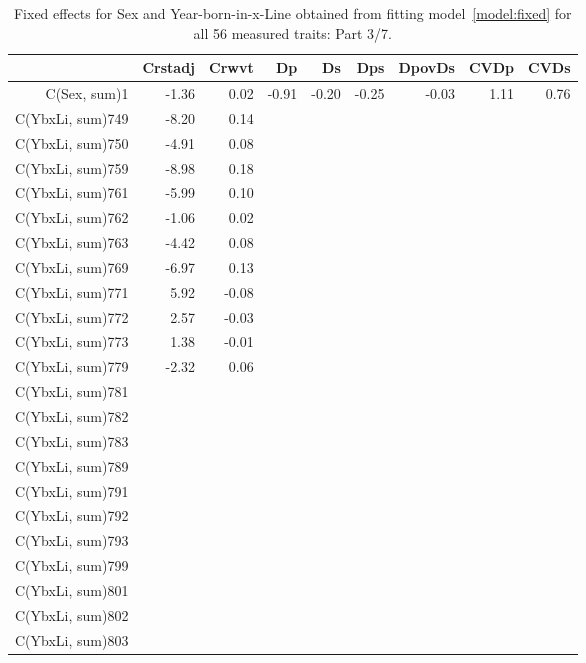 \begin{table}[p]
\centering
\caption{Fixed effects for Sex and Year-born-in-x-Line obtained from fitting model~\ref{model:fixed} for all 56 measured traits: Part 3/7.}
\label{tab:b3}
\begin{tabular}{rrrrrrrrr}
  \hline
 & Crstadj & Crwvt & Dp & Ds & Dps & DpovDs & CVDp & CVDs \\ 
  \hline
C(Sex, sum)1 & -1.36 & 0.02 & -0.91 & -0.20 & -0.25 & -0.03 & 1.11 & 0.76 \\ 
  C(YbxLi, sum)749 & -8.20 & 0.14 &  &  &  &  &  &  \\ 
  C(YbxLi, sum)750 & -4.91 & 0.08 &  &  &  &  &  &  \\ 
  C(YbxLi, sum)759 & -8.98 & 0.18 &  &  &  &  &  &  \\ 
  C(YbxLi, sum)761 & -5.99 & 0.10 &  &  &  &  &  &  \\ 
  C(YbxLi, sum)762 & -1.06 & 0.02 &  &  &  &  &  &  \\ 
  C(YbxLi, sum)763 & -4.42 & 0.08 &  &  &  &  &  &  \\ 
  C(YbxLi, sum)769 & -6.97 & 0.13 &  &  &  &  &  &  \\ 
  C(YbxLi, sum)771 & 5.92 & -0.08 &  &  &  &  &  &  \\ 
  C(YbxLi, sum)772 & 2.57 & -0.03 &  &  &  &  &  &  \\ 
  C(YbxLi, sum)773 & 1.38 & -0.01 &  &  &  &  &  &  \\ 
  C(YbxLi, sum)779 & -2.32 & 0.06 &  &  &  &  &  &  \\ 
  C(YbxLi, sum)781 &  &  &  &  &  &  &  &  \\ 
  C(YbxLi, sum)782 &  &  &  &  &  &  &  &  \\ 
  C(YbxLi, sum)783 &  &  &  &  &  &  &  &  \\ 
  C(YbxLi, sum)789 &  &  &  &  &  &  &  &  \\ 
  C(YbxLi, sum)791 &  &  &  &  &  &  &  &  \\ 
  C(YbxLi, sum)792 &  &  &  &  &  &  &  &  \\ 
  C(YbxLi, sum)793 &  &  &  &  &  &  &  &  \\ 
  C(YbxLi, sum)799 &  &  &  &  &  &  &  &  \\ 
  C(YbxLi, sum)801 &  &  &  &  &  &  &  &  \\ 
  C(YbxLi, sum)802 &  &  &  &  &  &  &  &  \\ 
  C(YbxLi, sum)803 &  &  &  &  &  &  &  &  \\ 

\end{tabular}
\end{table}
